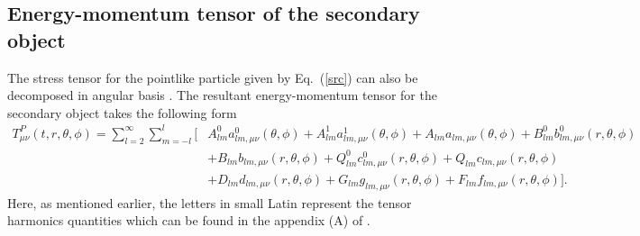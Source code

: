 \documentclass[11pt]{article}
\begin{document}
\subsection{Energy-momentum tensor of the secondary object}\label{App_pont_particle}
The stress tensor for the pointlike particle given by Eq.~(\ref{src}) can also be decomposed in angular basis \cite{PhysRevD.2.2141, PhysRevD.67.104017}. %
The resultant energy-momentum tensor for the secondary object takes the following form 
\begin{align}
T^{P}_{\mu\nu}(t, r, \theta, \phi)=\sum_{l=2}^{\infty}\sum_{m =-l}^{l}
\bigg[&{A}^{0}_{l m }a^{0}_{l m,\mu\nu}(\theta,\phi)+{A}^{1}_{l m}a^{1}_{l m,\mu\nu}(\theta,\phi) +{A}_{l m }a_{l m,\mu\nu}(\theta,\phi)+{B}^{0}_{l m }b^{0}_{l m,\mu\nu}(r,\theta,\phi)\nonumber\\
&+{B}_{l m }b_{l m,\mu\nu}(r,\theta,\phi)+{Q}^{0}_{l m }c^{0}_{l m,\mu\nu}(r,\theta,\phi)+{Q}_{l m }c_{l m,\mu\nu}(r,\theta,\phi)\nonumber\\
%
&+{D}_{l m }d_{l m,\mu\nu}(r,\theta,\phi)+{G}_{l m}g_{l m,\mu\nu}(r,\theta,\phi)+{F}_{l m }f_{l m,\mu\nu}(r,\theta,\phi)\bigg]. \label{harmonicexp}
\end{align}
Here, as mentioned earlier, the letters in small Latin represent the tensor harmonics quantities which can be found in the appendix (A) of \cite{PhysRevD.67.104017}.
\end{document}
